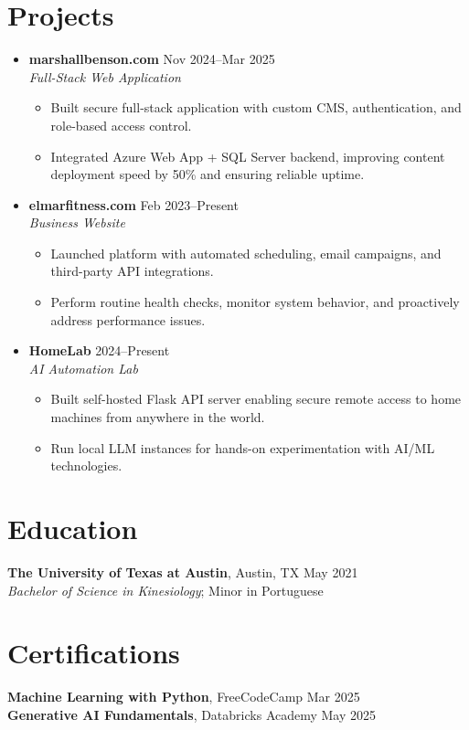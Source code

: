 \documentclass[letterpaper,10pt]{article}
\newcommand{\resumeItem}[1]{\item \small{#1}}
\begin{document}
\section*{Projects}
\begin{itemize}
  \item[]
    \textbf{marshallbenson.com} \hfill Nov 2024--Mar 2025 \\
    \textit{Full-Stack Web Application}
  \begin{itemize}
    \resumeItem{Built secure full-stack application with custom CMS, authentication, and role-based access control.}
    \resumeItem{Integrated Azure Web App + SQL Server backend, improving content deployment speed by 50\% and ensuring reliable uptime.}
  \end{itemize}

  \item[]
    \textbf{elmarfitness.com} \hfill Feb 2023--Present \\
    \textit{Business Website}
  \begin{itemize}
    \resumeItem{Launched platform with automated scheduling, email campaigns, and third-party API integrations.}
    \resumeItem{Perform routine health checks, monitor system behavior, and proactively address performance issues.}
  \end{itemize}

  \item[]
    \textbf{HomeLab} \hfill 2024--Present \\
    \textit{AI Automation Lab}
  \begin{itemize}
    \resumeItem{Built self-hosted Flask API server enabling secure remote access to home machines from anywhere in the world.}
    \resumeItem{Run local LLM instances for hands-on experimentation with AI/ML technologies.}
  \end{itemize}
\end{itemize}

\section*{Education}
\textbf{The University of Texas at Austin}, Austin, TX \hfill May 2021 \\
\textit{Bachelor of Science in Kinesiology}; Minor in Portuguese

\section*{Certifications}
\textbf{Machine Learning with Python}, FreeCodeCamp \hfill Mar 2025 \\
\textbf{Generative AI Fundamentals}, Databricks Academy \hfill May 2025
\end{document}
